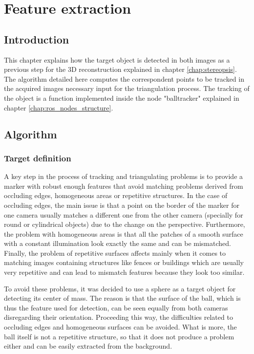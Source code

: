\chapter{Feature extraction} %
\label{chap:feature_extraction}
\section{Introduction}
This chapter explains how the target object is detected in both images as a previous step for the 3D reconstruction explained in chapter \ref{chap:stereopsis}. The algorithm detailed here computes the correspondent points to be tracked in the acquired images necessary input for the triangulation process.
The tracking of the object is a function implemented inside the node "balltracker" explained in chapter \ref{chap:ros_nodes_structure}.

\section{Algorithm}

\subsection{Target definition}
A key step in the process of tracking and triangulating problems is to provide a marker with robust enough features that avoid matching problems derived from occluding edges, homogeneous areas or repetitive structures.
In the case of occluding edges, the main issue is that a point on the border of the marker for one camera usually matches a different one from the other camera (specially for round or cylindrical objects) due to the change on the perspective.
Furthermore, the problem with homogeneous areas is that all the patches of a smooth surface with a constant illumination look exactly the same and can be mismatched.
Finally, the problem of repetitive surfaces affects mainly when it comes to matching images containing structures like fences or buildings which are usually very repetitive and can lead to mismatch features because they look too similar.

To avoid these problems, it was decided to use a sphere as a target object for detecting its center of mass.
The reason is that the surface of the ball, which is thus the feature used for detection, can be seen equally from both cameras disregarding their orientation. 
Proceeding this way, the difficulties related to occluding edges and homogeneous surfaces can be avoided.
What is more, the ball itself is not a repetitive structure, so that it does not produce a problem either and can be easily extracted from the background.

